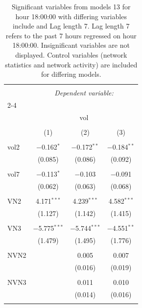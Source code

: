 
\begin{table}[!htbp] \centering 
  \caption{Significant variables from models 13 for hour 18:00:00 with differing variables include 
                               and Lag length 7. Lag length 7 refers to the past 7 hours regressed on hour 18:00:00. 
                               Insignificant variables are not displayed. 
                               Control variables (network statistics and network activity) are 
                               included for differing models.} 
  \label{Volumemodels2_t_hourlagged5} 
\scriptsize 
\begin{tabular}{@{\extracolsep{5pt}}lccc} 
\\[-1.8ex]\hline 
\hline \\[-1.8ex] 
 & \multicolumn{3}{c}{\textit{Dependent variable:}} \\ 
\cline{2-4} 
\\[-1.8ex] & \multicolumn{3}{c}{vol} \\ 
\\[-1.8ex] & (1) & (2) & (3)\\ 
\hline \\[-1.8ex] 
 vol2 & $-$0.162$^{*}$ & $-$0.172$^{**}$ & $-$0.184$^{**}$ \\ 
  & (0.085) & (0.086) & (0.092) \\ 
  & & & \\ 
 vol7 & $-$0.113$^{*}$ & $-$0.103 & $-$0.091 \\ 
  & (0.062) & (0.063) & (0.068) \\ 
  & & & \\ 
 VN2 & 4.171$^{***}$ & 4.239$^{***}$ & 4.582$^{***}$ \\ 
  & (1.127) & (1.142) & (1.415) \\ 
  & & & \\ 
 VN3 & $-$5.775$^{***}$ & $-$5.744$^{***}$ & $-$4.551$^{**}$ \\ 
  & (1.479) & (1.495) & (1.776) \\ 
  & & & \\ 
 NVN2 &  & 0.005 & 0.007 \\ 
  &  & (0.016) & (0.019) \\ 
  & & & \\ 
 NVN3 &  & 0.011 & 0.010 \\ 
  &  & (0.014) & (0.016) \\ 
  & & & \\ 

\end{tabular}
\end{table}
